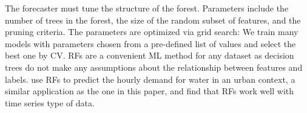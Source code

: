 The forecaster must tune the structure of the forest.
Parameters include the number of trees in the forest, the size of the random
    subset of features, and the pruning criteria.
The parameters are optimized via grid search: We train many models with
    parameters chosen from a pre-defined list of values and select the best
    one by CV.
RFs are a convenient ML method for any dataset as decision trees do not
    make any assumptions about the relationship between features and labels.
\cite{herrera2010} use RFs to predict the hourly demand for water in an urban
    context, a similar application as the one in this paper, and find that RFs
    work well with time series type of data.
